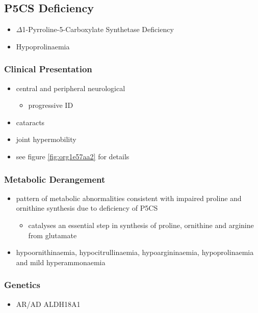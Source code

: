 \documentclass{scrartcl}
\begin{document}
\subsection{P5CS  Deficiency}
\label{sec:orgc1d8129}
\begin{itemize}
\item \(\Delta\)1-Pyrroline-5-Carboxylate Synthetase Deficiency
\item Hypoprolinaemia
\end{itemize}
\subsubsection{Clinical Presentation}
\label{sec:org5ae724b}
\begin{itemize}
\item central and peripheral neurological
\begin{itemize}
\item progressive ID
\end{itemize}
\item cataracts
\item joint hypermobility
\item see figure \ref{fig:org1e57aa2} for details
\end{itemize}

\subsubsection{Metabolic Derangement}
\label{sec:org7f0b17a}
\begin{itemize}
\item pattern of metabolic abnormalities consistent with impaired proline
and ornithine synthesis due to deficiency of P5CS
\begin{itemize}
\item catalyses an essential step in synthesis of proline, ornithine and
arginine from glutamate
\end{itemize}
\item hypoornithinaemia, hypocitrullinaemia, hypoargininaemia,
hypoprolinaemia and mild hyperammonaemia
\end{itemize}

\subsubsection{Genetics}
\label{sec:org5e3bee8}
\begin{itemize}
\item AR/AD ALDH18A1
\end{itemize}
\end{document}
